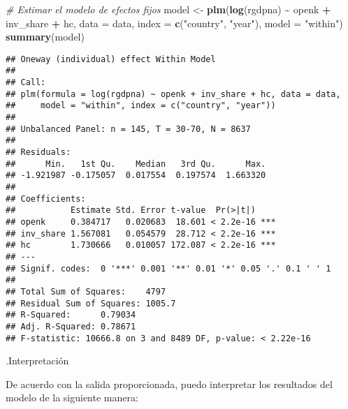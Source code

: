 \documentclass[
]{article}
\newenvironment{Shaded}{\begin{snugshade}}{\end{snugshade}}
\newcommand{\AttributeTok}[1]{\textcolor[rgb]{0.13,0.29,0.53}{#1}}
\newcommand{\CommentTok}[1]{\textcolor[rgb]{0.56,0.35,0.01}{\textit{#1}}}
\newcommand{\FunctionTok}[1]{\textcolor[rgb]{0.13,0.29,0.53}{\textbf{#1}}}
\newcommand{\NormalTok}[1]{#1}
\newcommand{\OtherTok}[1]{\textcolor[rgb]{0.56,0.35,0.01}{#1}}
\newcommand{\SpecialCharTok}[1]{\textcolor[rgb]{0.81,0.36,0.00}{\textbf{#1}}}
\newcommand{\StringTok}[1]{\textcolor[rgb]{0.31,0.60,0.02}{#1}}
\begin{document}
\begin{Shaded}
\begin{Highlighting}[]
\CommentTok{\# Estimar el modelo de efectos fijos}
\NormalTok{model }\OtherTok{\textless{}{-}} \FunctionTok{plm}\NormalTok{(}\FunctionTok{log}\NormalTok{(rgdpna) }\SpecialCharTok{\textasciitilde{}}\NormalTok{ openk }\SpecialCharTok{+}\NormalTok{ inv\_share }\SpecialCharTok{+}\NormalTok{ hc, }\AttributeTok{data =}\NormalTok{ data, }
             \AttributeTok{index =} \FunctionTok{c}\NormalTok{(}\StringTok{"country"}\NormalTok{, }\StringTok{"year"}\NormalTok{), }\AttributeTok{model =} \StringTok{"within"}\NormalTok{)}
\FunctionTok{summary}\NormalTok{(model)}
\end{Highlighting}
\end{Shaded}

\begin{verbatim}
## Oneway (individual) effect Within Model
## 
## Call:
## plm(formula = log(rgdpna) ~ openk + inv_share + hc, data = data, 
##     model = "within", index = c("country", "year"))
## 
## Unbalanced Panel: n = 145, T = 30-70, N = 8637
## 
## Residuals:
##      Min.   1st Qu.    Median   3rd Qu.      Max. 
## -1.921987 -0.175057  0.017554  0.197574  1.663320 
## 
## Coefficients:
##           Estimate Std. Error t-value  Pr(>|t|)    
## openk     0.384717   0.020683  18.601 < 2.2e-16 ***
## inv_share 1.567081   0.054579  28.712 < 2.2e-16 ***
## hc        1.730666   0.010057 172.087 < 2.2e-16 ***
## ---
## Signif. codes:  0 '***' 0.001 '**' 0.01 '*' 0.05 '.' 0.1 ' ' 1
## 
## Total Sum of Squares:    4797
## Residual Sum of Squares: 1005.7
## R-Squared:      0.79034
## Adj. R-Squared: 0.78671
## F-statistic: 10666.8 on 3 and 8489 DF, p-value: < 2.22e-16
\end{verbatim}

.Interpretación

De acuerdo con la salida proporcionada, puedo interpretar los resultados
del modelo de la siguiente manera:
\end{document}
